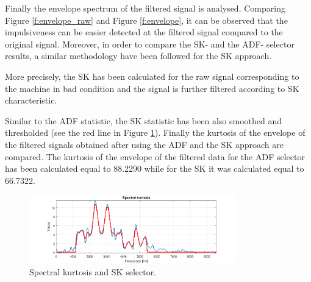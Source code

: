\documentclass[11pt]{article}
\begin{document}





Finally the envelope spectrum of the filtered signal is analysed. Comparing Figure \ref{f:envelope_raw} and Figure \ref{f:envelope}, it can be observed that the impulsiveness can be easier detected at the filtered signal compared to the original signal. Moreover, in order to compare the SK- and the ADF- selector results, a similar methodology have been followed for the SK approach. 

More precisely, the SK has been calculated for the raw signal corresponding to the machine in bad condition and the signal is further filtered according to SK characteristic. 

Similar to the ADF statistic, the SK statistic has been also smoothed and thresholded (see the red line in Figure \ref{f:SK}). Finally the kurtosis of the envelope of the filtered signals obtained after using the ADF and the SK approach are compared. The kurtosis of the envelope of the filtered data for the ADF selector has been calculated equal to 88.2290 while for the SK it was calculated equal to 66.7322.

\begin{figure}[!ht]
\begin{center}
\includegraphics[width=0.8\textwidth]{SK2.png}
\caption{Spectral kurtosis and SK selector. \label{f:SK}}
\end{center}
\end{figure}
\end{document}
